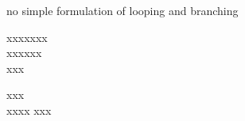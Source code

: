 no simple formulation of looping and branching









\endgroup









xxxxxxx\\
xxxxxx\\
xxx\immediate{}\unskip xxx\\
xxxx xxx

